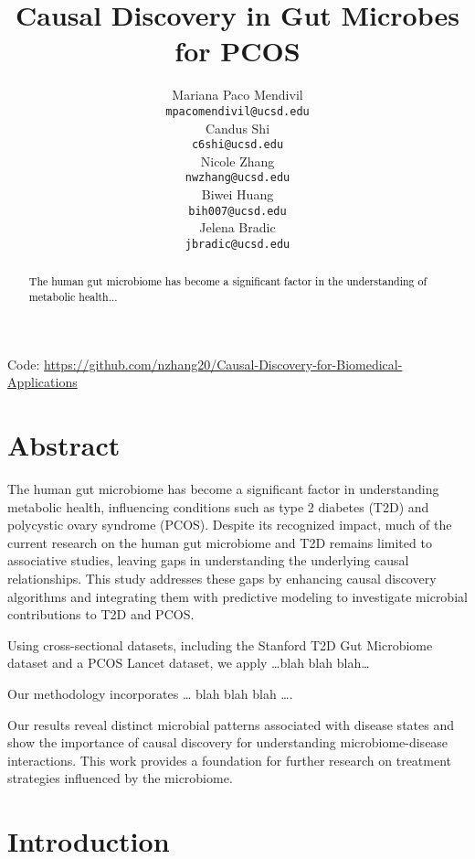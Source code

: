 \documentclass[12pt,letterpaper]{article}
\title{Causal Discovery in Gut Microbes for PCOS}
\author{Mariana Paco Mendivil \\
  {\tt mpacomendivil@ucsd.edu} \\\And
  Candus Shi \\
  {\tt c6shi@ucsd.edu} \\\And
  Nicole Zhang \\
  {\tt nwzhang@ucsd.edu} \\\And
  Biwei Huang \\
  {\tt bih007@ucsd.edu} \\\And
  Jelena Bradic \\
  {\tt jbradic@ucsd.edu}}
\begin{document}
\maketitle



\begin{abstract}
    \textcolor{black}{
    The human gut microbiome has become a significant factor in the understanding of metabolic health...}
\end{abstract}

\begin{center}

Code: \url{https://github.com/nzhang20/Causal-Discovery-for-Biomedical-Applications}
\end{center}

\maketoc
\clearpage


\section{Abstract}
The human gut microbiome has become a significant factor in understanding metabolic health, influencing conditions such as type 2 diabetes (T2D) and polycystic ovary syndrome (PCOS). Despite its recognized impact, much of the current research on the human gut microbiome and T2D remains limited to associative studies, leaving gaps in understanding the underlying causal relationships. This study addresses these gaps by enhancing causal discovery algorithms and integrating them with predictive modeling to investigate microbial contributions to T2D and PCOS.

Using cross-sectional datasets, including the Stanford T2D Gut Microbiome dataset and a PCOS Lancet dataset, we apply …blah blah blah…

Our methodology incorporates … blah blah blah ….

Our results reveal distinct microbial patterns associated with disease states and show the importance of causal discovery for understanding microbiome-disease interactions. This work provides a foundation for further research on treatment strategies influenced by the microbiome.


\section{Introduction}
\end{document}
